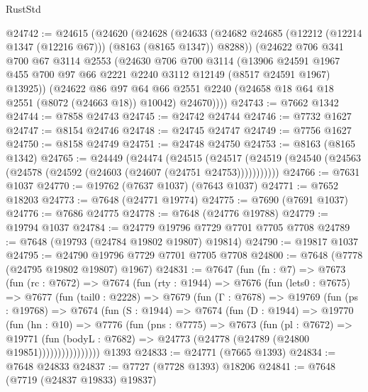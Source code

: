 \begin{lexlean}{RustStd}
\begin{coremodule}
@24742 := @24615
    (@24620
      (@24628
        (@24633 (@24682 @24685 (@12212 (@12214 @1347 (@12216 @67))) (@8163 (@8165 @1347)) @8288))
        (@24622
          @706
          @341
          @700
          @67
          @3114
          @2553
          (@24630
            @706
            @700
            @3114
            (@13906
              @24591
              @1967
              @455
              @700
              @97
              @66
              @2221
              @2240
              @3112
              @12149
              (@8517 @24591 @1967)
              @13925))
          (@24622
            @86
            @97
            @64
            @66
            @2551
            @2240
            (@24658 @18 @64 @18 @2551 (@8072 (@24663 @18)) @10042)
            @24670))))
@24743 := @7662 @1342
@24744 := @7858 @24743
@24745 := @24742 @24744
@24746 := @7732 @1627
@24747 := @8154 @24746
@24748 := @24745 @24747
@24749 := @7756 @1627
@24750 := @8158 @24749
@24751 := @24748 @24750
@24753 := @8163 (@8165 @1342)
@24765 := @24449
    (@24474
      (@24515
        (@24517 (@24519 (@24540 (@24563 (@24578 (@24592 (@24603 (@24607 (@24751 @24753)))))))))))
@24766 := @7631 @1037
@24770 := @19762 (@7637 @1037) (@7643 @1037)
@24771 := @7652 @18203
@24773 := @7648 (@24771 @19774)
@24775 := @7690 (@7691 @1037)
@24776 := @7686 @24775
@24778 := @7648 (@24776 @19788)
@24779 := @19794 @1037
@24784 := @24779 @19796 @7729 @7701 @7705 @7708
@24789 := @7648 (@19793 (@24784 @19802 @19807) @19814)
@24790 := @19817 @1037
@24795 := @24790 @19796 @7729 @7701 @7705 @7708
@24800 := @7648 (@7778 (@24795 @19802 @19807) @1967)
@24831 := @7647
    (fun (fn : @7) =>
    @7673
      (fun (rc : @7672) =>
      @7674
        (fun (rty : @1944) =>
        @7676
          (fun (lets0 : @7675) =>
          @7677
            (fun (tail0 : @2228) =>
            @7679
              (fun (Γ : @7678) =>
              @19769
                (fun (ps : @19768) =>
                @7674
                  (fun (S : @1944) =>
                  @7674
                    (fun (D : @1944) =>
                    @19770
                      (fun (hn : @10) =>
                      @7776
                        (fun (pns : @7775) =>
                        @7673
                          (fun (pl : @7672) =>
                          @19771
                            (fun (bodyL : @7682) =>
                            @24773 (@24778 (@24789 (@24800 @19851))))))))))))))))
    @1393
@24833 := @24771 (@7665 @1393)
@24834 := @7648 @24833
@24837 := @7727 (@7728 @1393) @18206
@24841 := @7648 (@7719 (@24837 @19833) @19837)

\end{coremodule}
\end{lexlean}
